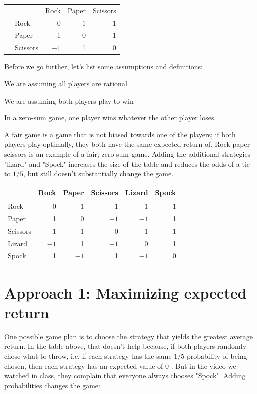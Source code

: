 \documentclass[10pt]{article}
\begin{document}
\begin{tabular}{|r|l|r|r|r|}
\hline
 &  &  &  &  \\
\hline
 &  & Rock & Paper & Scissors \\
\hline
 & Rock & 0 & $-1$ & 1 \\
\hline
 & Paper & 1 & 0 & $-1$ \\
\hline
 & Scissors & $-1$ & 1 & 0 \\
\hline
\end{tabular}

Before we go further, let's list some assumptions and definitions:

We are assuming all players are rational

We are assuming both players play to win

In a zero-sum game, one player wins whatever the other player loses.

A fair game is a game that is not biased towards one of the players; if both players play optimally, they both have the same expected return of. Rock paper scissors is an example of a fair, zero-sum game. Adding the additional strategies "lizard" and "Spock" increases the size of the table and reduces the odds of a tie to $1 / 5$, but still doesn't substantially change the game.

\begin{tabular}{|l|r|r|r|r|r|}
\hline
 & \multicolumn{1}{|l|}{Rock} & \multicolumn{1}{l|}{Paper} & \multicolumn{1}{l|}{Scissors} & Lizard & \multicolumn{1}{l|}{Spock} \\
\hline
Rock & 0 & $-1$ & 1 & 1 & $-1$ \\
\hline
Paper & 1 & 0 & $-1$ & $-1$ & 1 \\
\hline
Scissors & $-1$ & 1 & 0 & 1 & $-1$ \\
\hline
Lizard & $-1$ & 1 & $-1$ & 0 & 1 \\
\hline
Spock & 1 & $-1$ & 1 & $-1$ & 0 \\
\hline
\end{tabular}

\section{Approach 1: Maximizing expected return}
One possible game plan is to choose the strategy that yields the greatest average return. In the table above, that doesn't help because, if both players randomly chose what to throw, i.e. if each strategy has the same $1 / 5$ probability of being chosen, then each strategy has an expected value of 0 . But in the video we watched in class, they complain that everyone always chooses "Spock". Adding probabilities changes the game:
\end{document}
